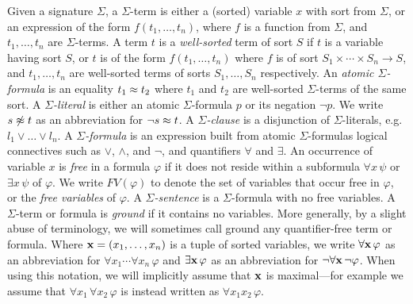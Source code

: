 \documentclass{svjour3}                     %
\begin{document}
Given a signature $\Sigma$,
a $\Sigma$-term is either a (sorted) variable $x$ with sort from $\Sigma$,
or an expression of the form $f( t_1, \ldots, t_n )$, 
where $f$ is a function from $\Sigma$, and $t_1, \ldots, t_n$ are $\Sigma$-terms.
A term $t$ is a \emph{well-sorted} term of sort $S$ if $t$ is a variable having sort $S$, 
or $t$ is of the form $f( t_1, \ldots, t_n )$ where
$f$ is of sort $S_1 \times \cdots \times S_n \rightarrow S$, and
$t_1, \ldots, t_n$ are well-sorted terms of sorts $S_1, \ldots, S_n$ respectively.
An \emph{atomic $\Sigma$-formula} is an equality $t_1 \approx t_2$ where $t_1$ and $t_2$ are well-sorted $\Sigma$-terms of the same sort.
A \emph{$\Sigma$-literal} is either an atomic $\Sigma$-formula $p$ or its negation $\neg p$.
We write $s \not\approx t$ as an abbreviation for $\neg s \approx t$.
A \emph{$\Sigma$-clause} is a disjunction of $\Sigma$-literals, e.g. $l_1 \vee \ldots \vee l_n$.
A \emph{$\Sigma$-formula} is an expression built from atomic $\Sigma$-formulas
logical connectives such as $\vee$, $\wedge$, and $\neg$, and
quantifiers $\forall$ and $\exists$.
An occurrence of variable $x$ is \emph{free} in a formula $\varphi$
if it does not reside within a subformula $\forall x\, \psi$ or $\exists x\, \psi$ of $\varphi$.
We write $FV( \varphi )$ to denote the set of variables that occur free in $\varphi$,
or the \emph{free variables} of $\varphi$.
A \emph{$\Sigma$-sentence} is a $\Sigma$-formula with no free variables.
A $\Sigma$-term or formula is \emph{ground} if it contains no variables.
More generally, by a slight abuse of terminology, we will sometimes call ground 
any quantifier-free term or formula.
Where $\mathbf{x} = (x_1,\ldots,x_n)$ is a tuple of sorted variables,
we write $\forall \mathbf{x}\, \varphi$ as an abbreviation for
$\forall x_1 \cdots \forall x_n\, \varphi$
and $\exists \mathbf{x}\, \varphi$ as an abbreviation for
$\neg \forall \mathbf{x}\, \neg \varphi$.
When using this notation, we will implicitly assume that $\mathbf{x}$ is maximal---for example
we assume that $\forall x_1\, \forall x_2\, \varphi$ is instead written as $\forall x_1 x_2\, \varphi$.

\end{document}
